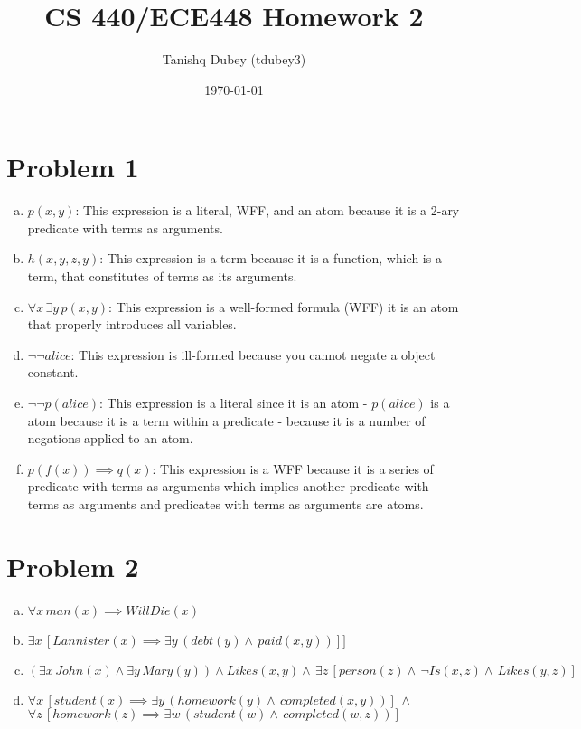 \documentclass[12pt]{article}%
\begin{document}
\title{CS 440/ECE448 Homework 2}
\author{Tanishq Dubey (tdubey3)}
\date{\today}
\maketitle
\section*{Problem 1}
    \begin{enumerate}[a)]
            \item
                $p(x,y)$: This expression is a literal, WFF, and an atom because it is a 2-ary predicate with terms as arguments.
            \item
                $h(x, y, z, y)$: This expression is a term because it is a function, which is a term, that constitutes of terms as its arguments.
            \item
                $\forall x\, \exists y\, p(x, y)$: This expression is a well-formed formula (WFF) it is an atom that properly introduces all variables.
            \item
                $\neg \neg alice$: This expression is ill-formed because you cannot negate a object constant.
            \item
                $\neg \neg p(alice)$: This expression is a literal since it is an atom - $p(alice)$ is a atom because it is a term within a predicate - because it is a number of negations applied to an atom.
            \item
                $p(f(x)) \implies q(x)$: This expression is a WFF because it is a series of predicate with terms as arguments which implies another predicate with terms as arguments and predicates with terms as arguments are atoms.
    \end{enumerate}

\section*{Problem 2}
    \begin{enumerate}[a)]
        \item
            $\forall x\, man(x) \implies WillDie(x)$
        \item
            $\exists x\, [Lannister(x) \implies \exists y\,(debt(y) \land \, paid(x,y))]]$
        \item
            $(\exists x \, John(x) \land \exists y \, Mary(y))\land Likes(x, y) \land \, \exists z \, [person(z) \land \, \neg Is(x, z) \land \, Likes(y, z)]$
        \item
            ${\forall x \, [student(x) \implies \exists y \, (homework(y) \land \, completed(x, y))]} \, \land \,$ \newline
            $ {\forall z \, [homework(z) \implies \exists w \, (student(w) \land \, completed(w, z))]}$
    \end{enumerate}
\end{document}
